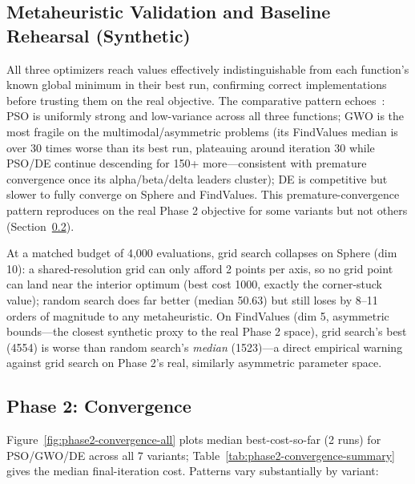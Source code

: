 \documentclass[conference, letterpaper]{IEEEtran}
\begin{document}
\subsection{Metaheuristic Validation and Baseline Rehearsal (Synthetic)}
\label{sec:validation-results}

All three optimizers reach values effectively indistinguishable from each function's known global minimum in their best run, confirming correct implementations before trusting them on the real objective. The comparative pattern echoes~\cite{ref11}: PSO is uniformly strong and low-variance across all three functions; GWO is the most fragile on the multimodal/asymmetric problems (its FindValues median is over 30 times worse than its best run, plateauing around iteration 30 while PSO/DE continue descending for 150+ more---consistent with premature convergence once its alpha/beta/delta leaders cluster); DE is competitive but slower to fully converge on Sphere and FindValues. This premature-convergence pattern reproduces on the real Phase 2 objective for some variants but not others (Section~\ref{sec:phase2-convergence}).

At a matched budget of 4,000 evaluations, grid search collapses on Sphere (dim 10): a shared-resolution grid can only afford 2 points per axis, so no grid point can land near the interior optimum (best cost 1000, exactly the corner-stuck value); random search does far better (median 50.63) but still loses by 8--11 orders of magnitude to any metaheuristic. On FindValues (dim 5, asymmetric bounds---the closest synthetic proxy to the real Phase 2 space), grid search's best (4554) is worse than random search's \emph{median} (1523)---a direct empirical warning against grid search on Phase 2's real, similarly asymmetric parameter space.

\subsection{Phase 2: Convergence}
\label{sec:phase2-convergence}

Figure~\ref{fig:phase2-convergence-all} plots median best-cost-so-far (2 runs) for PSO/GWO/DE across all 7 variants; Table~\ref{tab:phase2-convergence-summary} gives the median final-iteration cost. Patterns vary substantially by variant:
\end{document}
